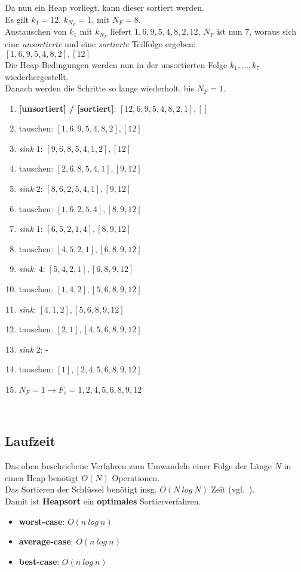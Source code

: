 \noindent
Da nun ein Heap vorliegt, kann dieser sortiert werden.\\
Es gilt $k_1 = 12$, $k_{N_F} = 1$, mit $N_F = 8$.\\
Austauschen von $k_1$ mit $k_{N_F}$ liefert $1, 6, 9, 5, 4, 8, 2, 12$, $N_F$ ist nun $7$, woraus sich eine \textit{unsortierte} und eine \textit{sortierte} Teilfolge ergeben:\\
$[1, 6, 9, 5, 4, 8, 2], [12]$
\\
Die Heap-Bedingungen werden nun in der unsortierten Folge $k_1, \ldots, k_7$ wiederhergestellt.\\
Danach werden die Schritte so lange wiederholt, bis $N_F = 1$.\\

\begin{enumerate}
    \item \textbf{[unsortiert] / [sortiert]}: $[12, 6, 9, 5, 4, 8, 2, 1], []$
    \item tauschen: $[1, 6, 9, 5, 4, 8, 2], [12]$
    \item \textit{sink} $1$: $[9, 6, 8, 5, 4, 1, 2], [12]$
    \item tauschen: $[2, 6, 8, 5, 4, 1], [9, 12]$
    \item \textit{sink} $2$: $[8, 6, 2, 5, 4, 1], [9, 12]$
    \item tauschen: $[1, 6, 2, 5, 4], [8, 9, 12]$
    \item \textit{sink} $1$: $[6, 5, 2, 1, 4], [8, 9, 12]$
    \item tauschen: $[4, 5, 2, 1], [6, 8, 9, 12]$
    \item \textit{sink}: $4$: $[5, 4, 2, 1], [6, 8, 9, 12]$
    \item tauschen: $[1, 4, 2], [5, 6, 8, 9, 12]$
    \item \textit{sink}: $[4, 1, 2], [5, 6, 8, 9, 12]$
    \item tauschen: $[2, 1], [4, 5, 6, 8, 9, 12]$
    \item \textit{sink} $2$: -
    \item tauschen: $[1], [2, 4, 5, 6, 8, 9, 12]$
    \item $N_F=1 \rightarrow F_s= 1, 2, 4, 5, 6, 8, 9, 12$
\end{enumerate}\\

\subsection{Laufzeit}
Das oben beschriebene Verfahren zum Umwandeln einer Folge der Länge $N$ in einen Heap benötigt $O(N)$ Operationen.\\
Das Sortieren der Schlüssel benötigt insg. $O(N\ log\ N)$ Zeit (vgl.~\cite[112]{OW17b}).\\

\noindent
Damit ist \textbf{Heapsort} ein \textbf{optimales} Sortierverfahren.

\begin{itemize}
    \item \textbf{worst-case}: $O(n\ log\ n)$
    \item \textbf{average-case}:  $O(n\ log\ n)$
    \item \textbf{best-case}:  $O(n\ log\ n)$
\end{itemize}